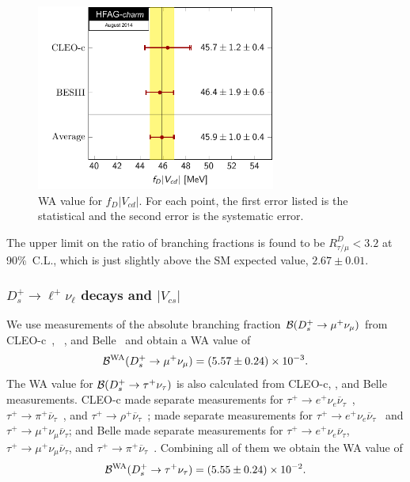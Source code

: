 \begin{figure}[hbt!]
\centering
\includegraphics[width=0.7\textwidth]{figures/charm/fDVcd.pdf}
\caption{
WA value for $f_{D}|V_{cd}|$. For each point, the first error listed is the statistical and the second error is the systematic error.
\label{fig:ExpDLeptonic}
}
\end{figure}
 
The upper limit on the ratio of branching fractions is found to be $R_{\tau/\mu}^D<3.2$ at 90\%~C.L., which is just slightly above the SM expected value, $2.67\pm0.01$.

\subsubsection{$D_s^+\to \ell^+\nu_{\ell}$ decays and $|V_{cs}|$}

We use measurements of the absolute branching fraction ${\cal B}(D_s^+\to\mu^+\nu_{\mu})$ from CLEO-c~\cite{Alexander:2009ux}, \babar~\cite{delAmoSanchez:2010jg},
and Belle~\cite{Zupanc:2013byn} and obtain a WA value of
\begin{equation}
 {\cal B}^{\rm WA}(D_{s}^+\to\mu^+\nu_{\mu}) = (5.57\pm0.24)\times10^{-3}.
 \label{eq:Br:WA:DstoMuNu}
\end{equation}
The WA value for ${\cal B}(D_s^+\to\tau^+\nu_{\tau})$ is also calculated from CLEO-c, \babar, and Belle measurements. 
CLEO-c made separate measurements for $\tau^+\to e^+\nu_e\overline{\nu}{}_{\tau}$~\cite{Naik:2009tk},
$\tau^+\to\pi^+\overline{\nu}{}_{\tau}$~\cite{Alexander:2009ux}, and
$\tau^+\to\rho^+\overline{\nu}{}_{\tau}$~\cite{Onyisi:2009th};
\babar made separate measurements for 
$\tau^+\to e^+\nu_e\overline{\nu}{}_{\tau}$~\cite{delAmoSanchez:2010jg} and $\tau^+\to \mu^+\nu_{\mu}\overline{\nu}{}_{\tau}$; and
Belle made separate measurements for $\tau^+\to e^+\nu_e\overline{\nu}{}_{\tau}$, $\tau^+\to \mu^+\nu_{\mu}\overline{\nu}{}_{\tau}$, 
and $\tau^+\to\pi^+\overline{\nu}{}_{\tau}$~\cite{Zupanc:2013byn}.
Combining all of them we obtain the WA value of
\begin{equation}
 {\cal B}^{\rm WA}(D_{s}^+\to\tau^+\nu_{\tau}) = (5.55\pm0.24)\times10^{-2}.
 \label{eq:Br:WA:DstoTauNu}
\end{equation}

